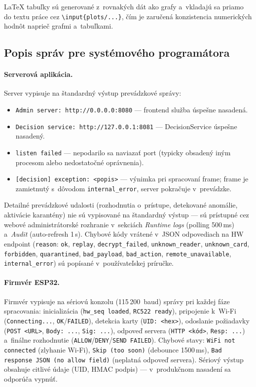 \documentclass[a4paper]{feidipsp}
\begin{document}
\noindent LaTeX tabuľky sú generované z~rovnakých dát ako grafy a~vkladajú sa priamo do textu práce cez \texttt{\textbackslash input\{plots/...\}}, čím je zaručená konzistencia numerických hodnôt naprieč grafmi a~tabuľkami.

\subsection{Popis správ pre systémového programátora}

\paragraph{Serverová aplikácia.}
Server vypisuje na štandardný výstup prevádzkové správy:

\begin{itemize}
\item \texttt{Admin server: http://0.0.0.0:8080} --- frontend služba úspešne nasadená.
\item \texttt{Decision service: http://127.0.0.1:8081} --- DecisionService úspešne nasadený.
\item \texttt{listen failed} --- nepodarilo sa naviazať port (typicky obsadený iným procesom alebo nedostatočné oprávnenia).
\item \texttt{[decision] exception: <popis>} --- výnimka pri spracovaní frame; frame je zamietnutý s~dôvodom \texttt{internal\_error}, server pokračuje v~prevádzke.
\end{itemize}

\noindent Detailné prevádzkové udalosti (rozhodnutia o~prístupe, detekované anomálie, aktivácie karantény) nie sú vypisované na štandardný výstup --- sú prístupné cez webové administrátorské rozhranie v~sekciách \emph{Runtime logs} (polling 500\,ms) a~\emph{Audit} (auto-refresh 1\,s). Chybové kódy vrátené v~JSON odpovediach na HW endpoint (\texttt{reason}: \texttt{ok}, \texttt{replay}, \texttt{decrypt\_failed}, \texttt{unknown\_reader}, \texttt{unknown\_card}, \texttt{forbidden}, \texttt{quarantined}, \texttt{bad\_payload}, \texttt{bad\_action}, \texttt{remote\_unavailable}, \texttt{internal\_error}) sú popísané v~používateľskej príručke.

\paragraph{Firmvér ESP32.}
Firmvér vypisuje na sériovú konzolu (115\,200~baud) správy pri každej fáze spracovania: inicializácia (\texttt{hw\_seq loaded}, \texttt{RC522 ready}), pripojenie k~Wi-Fi (\texttt{Connecting...}, \texttt{OK}/\texttt{FAILED}), detekcia karty (\texttt{UID: <hex>}), odoslanie požiadavky (\texttt{POST <URL>}, \texttt{Body: ...}, \texttt{Sig: ...}), odpoveď servera (\texttt{HTTP <kód>}, \texttt{Resp: ...}) a~finálne rozhodnutie (\texttt{ALLOW}/\texttt{DENY}/\texttt{SEND FAILED}). Chybové stavy: \texttt{WiFi not connected} (zlyhanie Wi-Fi), \texttt{Skip (too soon)} (debounce 1500\,ms), \texttt{Bad response JSON (no allow field)} (neplatná odpoveď servera). Sériový výstup obsahuje citlivé údaje (UID, HMAC podpis) --- v~produkčnom nasadení sa odporúča vypnúť.
\end{document}
